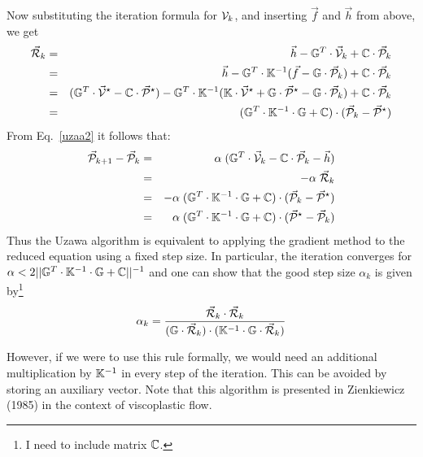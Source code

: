 Now substituting the iteration formula for ${\cal V}_k$, and inserting $\vec{f}$ and $\vec{h}$ from above,
we get
\begin{eqnarray}
\vec{\cal R}_k 
&=& \vec{h} -{\mathbb{G}}^T  \cdot \vec{\cal V}_k  +{\mathbb{C}} \cdot \vec{\cal P}_{k} \nonumber\\
&=& \vec{h} -\mathbb{G}^T\cdot \mathbb{K}^{-1} (\vec f - \mathbb{G}\cdot \vec{\cal P}_{k})  +{\mathbb{C}} \cdot \vec{\cal P}_{k}\nonumber\\
&=& ({\mathbb{G}}^T\cdot\vec{\cal V}^\star - {\mathbb{C}} \cdot \vec{\cal P}^\star) -\mathbb{G}^T\cdot \mathbb{K}^{-1} ({\mathbb{K}}\cdot\vec{\cal V}^\star 
+ {\mathbb{G}}\cdot\vec{\cal P}^\star - {{\mathbb{G}}}\cdot \vec{\cal P}_{k})+{\mathbb{C}} \cdot \vec{\cal P}_{k} \nonumber\\
&=& ({{\mathbb{G}}}^T \cdot \mathbb{K}^{-1} \cdot \mathbb{G} + {\mathbb{C}})\cdot (\vec {\cal P}_{k} - \vec{\cal P}^\star) 
\end{eqnarray}
From Eq.~\eqref{uzaa2} it follows that:
\begin{eqnarray}
\vec{\cal P}_{k+1} - \vec{\cal P}_{k}  
&=& \alpha\; (\mathbb{G}^T\cdot \vec{\cal V}_k -{\mathbb{C}} \cdot \vec{\cal P}_{k} -\vec h) \\
&=& -\alpha\; \vec{\cal R}_k \\ 
&=& -\alpha\; ( \mathbb{G}^T \cdot \mathbb{K}^{-1} \cdot \mathbb{G} + {\mathbb{C}} )
\cdot (\vec {\cal P}_{k} -\vec{\cal P}^\star)\\ 
&=& \alpha\; (\mathbb{G}^T \cdot \mathbb{K}^{-1} \cdot \mathbb{G} + {\mathbb{C}}) \cdot 
(\vec{\cal P}^\star - \vec {\cal P}_{k} ) 
\end{eqnarray}
Thus the Uzawa algorithm is equivalent to applying the gradient method 
to the reduced equation using a fixed step size. 
In particular, the iteration converges for
$
\alpha < 2 || {\mathbb{G}}^T \cdot {\mathbb{K}}^{-1} \cdot {\mathbb{G}} + {\mathbb{C}}||^{-1}
$
and one can show that the good step size $\alpha_k$ is given by\footnote{I need to include matrix ${\mathbb{C}}$.}
\begin{equation}
\alpha_k = \frac{\vec{\cal R}_k \cdot \vec{\cal R}_k}
{({\mathbb{G}} \cdot \vec{\cal R}_k)\cdot ({\mathbb{K}}^{-1}\cdot {\mathbb{G}} \cdot \vec{\cal R}_k)}
\label{uzaa3}
\end{equation}



However, if we were to use this rule formally, we would 
need an additional multiplication by ${\mathbb{K}}^{-1}$ in every step 
of the iteration. This can be avoided by storing an 
auxiliary vector. 
Note that this algorithm is presented in Zienkiewicz \etal (1985) \cite{zivt85} 
in the context of viscoplastic flow.


